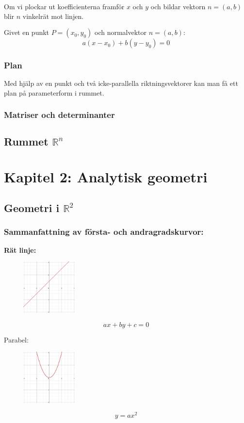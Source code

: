 \documentclass[a4paper,12pt]{article}
\begin{document}
Om vi plockar ut koefficienterna framför $x$ och $y$ och bildar vektorn $n = (a,b)$ blir $n$ vinkelrät mot linjen.  

Givet en punkt $P=(x_0,y_0)$ och normalvektor $n=(a,b)$:
\[
a(x - x_0) + b(y - y_0) = 0
\]

\subsubsection*{Plan}
Med hjälp av en punkt och två icke-parallella riktningsvektorer kan man få ett plan på parameterform i rummet.

\subsubsection*{Matriser och determinanter}

\subsection{Rummet $\mathbb{R}^n$}


\section{Kapitel 2: Analytisk geometri}

\subsection{Geometri i $\mathbb{R}^2$}
\subsubsection*{Sammanfattning av första- och andragradskurvor:}
\textbf{Rät linje:}

\begin{figure}[H]
  \centering
  \includegraphics[width=0.25\textwidth]{ratlinje.png}
\end{figure}
\[
ax + by + c = 0
\]

Parabel:
\begin{figure}[H]
  \centering
  \includegraphics[width=0.25\textwidth]{parabel.png}
\end{figure}
\[
y = ax^2
\]
\end{document}
